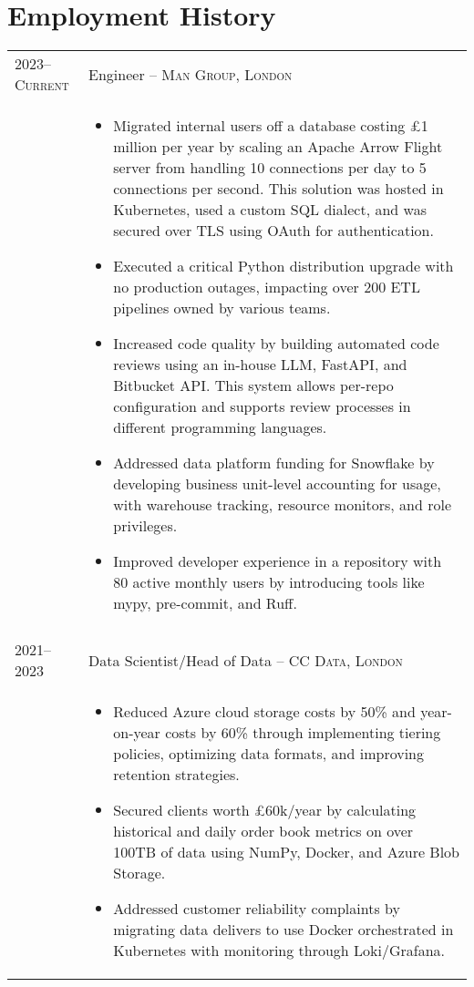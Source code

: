 \documentclass[a4paper,10pt]{article}
\begin{document}
\section{Employment History}
\begin{tabular}{p{2.25cm}|p{15cm}}
\textsc{2023--Current} & \large{Engineer -- \textsc{Man Group, London}}\\
	& \vspace{-0.07 in}\begin{itemize}
		\item Migrated internal users off a database costing £1 million per year by scaling an Apache Arrow Flight server from handling 10 connections per day to 5 connections per second. This solution was hosted in Kubernetes, used a custom SQL dialect, and was secured over TLS using OAuth for authentication.
		\item Executed a critical Python distribution upgrade with no production outages, impacting over 200 ETL pipelines owned by various teams.
		\item Increased code quality by building automated code reviews using an in-house LLM, FastAPI, and Bitbucket API. This system allows per-repo configuration and supports review processes in different programming languages.
		\item Addressed data platform funding for Snowflake by developing business unit-level accounting for usage, with warehouse tracking, resource monitors, and role privileges.
		\item Improved developer experience in a repository with 80 active monthly users by introducing tools like mypy, pre-commit, and Ruff.
	\end{itemize}\vspace{-0.1 in}\\
\multicolumn{2}{c}{}\\
	\textsc{2021--2023} & \large{Data Scientist/Head of Data -- \textsc{CC Data, London}}\\
	 & \vspace{-0.07 in}\begin{itemize}
		\item Reduced Azure cloud storage costs by 50\% and year-on-year costs by 60\% through implementing tiering policies, optimizing data formats, and improving retention strategies.
		\item Secured clients worth £60k/year by calculating historical and daily order book metrics on over 100TB of data using NumPy, Docker, and Azure Blob Storage.
		\item Addressed customer reliability complaints by migrating data delivers to use Docker orchestrated in Kubernetes with monitoring through Loki/Grafana.

\end{itemize}
\end{tabular}
\end{document}
